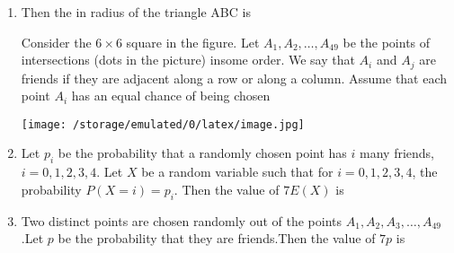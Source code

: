 \documentclass[12pt,a4paper]{article}
\begin{document}
\begin{enumerate}
\item Then the in radius of the triangle ABC is


\vspace{1.5cm}
\noindent Consider the $6 \times 6$ square in the figure. Let $A_1, A_2, \ldots, A_{49}$ be the points of intersections (dots in the picture) insome order. We say that $A_i$ and $A_j$ are friends if they are adjacent along a row or along a column. Assume that each point $A_i$ has an equal chance of being chosen

\begin{center}
\texttt{[image: /storage/emulated/0/latex/image.jpg]}
\end{center}


\item Let $p_i$ be the probability that a randomly chosen point has $i$ many friends, $i = 0, 1, 2, 3, 4$. Let $X$ be a random variable such that for $i = 0, 1, 2, 3, 4$, the probability $P(X = i) = p_i$. Then the value of $7E(X)$ is


\item Two distinct points are chosen randomly out of the points $A_1, A_2, A_3, \dots, A_{49}$.Let $p$ be the probability that they are friends.Then the value of $7p$ is

\end{enumerate}                       
\end{document}
